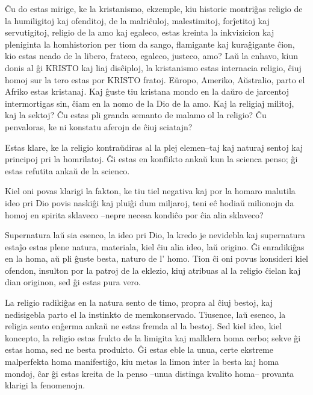 Ĉu do estas mirige, ke la kristanismo, ekzemple, kiu historie montriĝas religio de la humiligitoj kaj ofenditoj, de la malriĉuloj, malestimitoj, forĵetitoj kaj servutigitoj, religio de la amo kaj egaleco, estas kreinta la inkvizicion kaj pleniginta la homhistorion per tiom da sango, flamigante kaj kuraĝigante ĉion, kio estas neado de la libero, frateco, egaleco, justeco, amo? Laŭ la enhavo, kiun donis al ĝi KRISTO kaj liaj disĉiploj, la kristanismo estas internacia religio, ĉiuj homoj sur la tero estas por KRISTO fratoj. Eŭropo, Ameriko, Aŭstralio, parto el Afriko estas kristanaj. Kaj ĝuste tiu kristana mondo en la daŭro de jarcentoj intermortigas sin, ĉiam en la nomo de la Dio de la amo. Kaj la religiaj militoj, kaj la sektoj? Ĉu estas pli granda semanto de malamo ol la religio? Ĉu penvaloras, ke ni konstatu aferojn de ĉiuj sciatajn?

Estas klare, ke la religio kontraŭdiras al la plej elemen–taj kaj naturaj sentoj kaj principoj pri la homrilatoj. Ĝi estas en konflikto ankaŭ kun la scienca penso; ĝi estas refutita ankaŭ de la scienco.

Kiel oni povas klarigi la fakton, ke tiu tiel negativa kaj por la homaro malutila ideo pri Dio povis naskiĝi kaj pluiĝi dum miljaroj, teni eĉ hodiaŭ milionojn da homoj en spirita sklaveco –nepre necesa kondiĉo por ĉia alia sklaveco?

Supernatura laŭ sia esenco, la ideo pri Dio, la kredo je nevidebla kaj supernatura estaĵo estas plene natura, materiala, kiel ĉiu alia ideo, laŭ origino. Ĝi enradikiĝas en la homa, aŭ pli ĝuste besta, naturo de l’ homo. Tion ĉi oni povus konsideri kiel ofendon, insulton por la patroj de la eklezio, kiuj atribuas al la religio ĉielan kaj dian originon, sed ĝi estas pura vero.

La religio radikiĝas en la natura sento de timo, propra al ĉiuj bestoj, kaj nedisigebla parto el la instinkto de memkonservado. Tiusence, laŭ esenco, la religia sento enĝerma ankaŭ ne estas fremda al la bestoj. Sed kiel ideo, kiel koncepto, la religio estas frukto de la limigita kaj malklera homa cerbo; sekve ĝi estas homa, sed ne besta produkto. Ĝi estas eble la unua, certe ekstreme malperfekta homa manifestiĝo, kiu metas la limon inter la besta kaj homa mondoj, ĉar ĝi estas kreita de la penso –unua distinga kvalito homa– provanta klarigi la fenomenojn.

